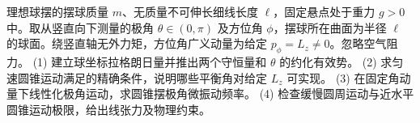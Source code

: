 理想球摆的摆球质量 \(m\)、无质量不可伸长细线长度 \(\ell\)，固定悬点处于重力 \(g>0\) 中。取从竖直向下测量的极角 \(\theta\in(0,\pi)\) 及方位角 \(\phi\)，摆球所在曲面为半径 \(\ell\) 的球面。绕竖直轴无外力矩，方位角广义动量为给定 \(p_\phi=L_z\ne0\)。忽略空气阻力。
(1) 建立球坐标拉格朗日量并推出两个守恒量和 \(\theta\) 的约化有效势。
(2) 求匀速圆锥运动满足的精确条件，说明哪些平衡角对给定 \(L_z\) 可实现。
(3) 在固定角动量下线性化极角运动，求圆锥摆极角微振动频率。
(4) 检查缓慢圆周运动与近水平圆锥运动极限，给出线张力及物理约束。
